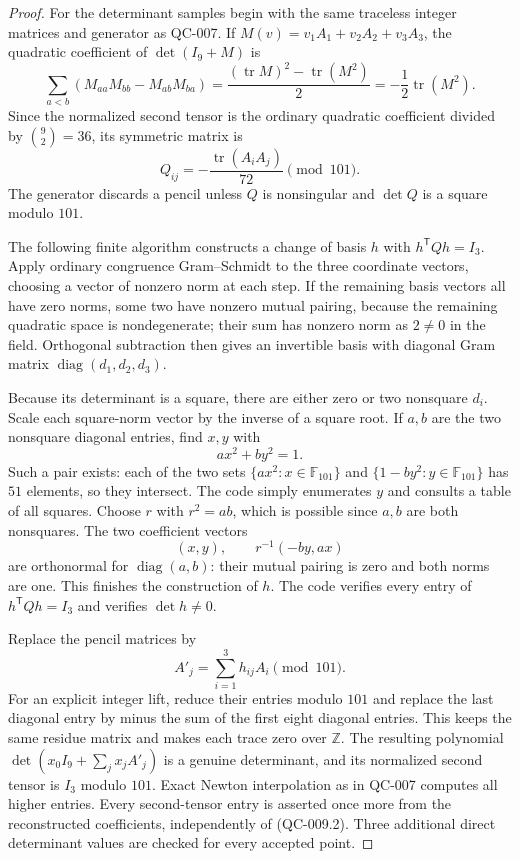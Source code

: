 \begin{proof}
For the determinant samples begin with the same traceless integer
matrices and generator as QC-007. If
$M(v)=v_1A_1+v_2A_2+v_3A_3$, the quadratic coefficient of
$\det(I_9+M)$ is
\[
 \sum_{a<b}(M_{aa}M_{bb}-M_{ab}M_{ba})
 =\frac{(\operatorname{tr}M)^2-\operatorname{tr}(M^2)}2
 =-\frac12\operatorname{tr}(M^2).
\]
Since the normalized second tensor is the ordinary quadratic
coefficient divided by $\binom92=36$, its symmetric matrix is
\[
 Q_{ij}=-\frac{\operatorname{tr}(A_iA_j)}{72}\pmod {101}.
 \tag{QC-009.2}
\]
The generator discards a pencil unless $Q$ is nonsingular and
$\det Q$ is a square modulo $101$.

The following finite algorithm constructs a change of basis $h$
with $h^{\mathsf T}Qh=I_3$. Apply ordinary congruence
Gram--Schmidt to the three coordinate vectors, choosing a vector
of nonzero norm at each step. If the remaining basis vectors
all have zero norms, some two have nonzero mutual pairing,
because the remaining quadratic space is nondegenerate; their
sum has nonzero norm as $2\ne0$ in the field. Orthogonal
subtraction then gives an invertible basis with diagonal Gram
matrix $\operatorname{diag}(d_1,d_2,d_3)$.

Because its determinant is a square, there are either zero or
two nonsquare $d_i$. Scale each square-norm vector by the
inverse of a square root. If $a,b$ are the two nonsquare
diagonal entries, find $x,y$ with
\[
 ax^2+by^2=1.
\]
Such a pair exists: each of the two sets
$\{ax^2:x\in\mathbb F_{101}\}$ and
$\{1-by^2:y\in\mathbb F_{101}\}$ has $51$ elements,
so they intersect. The code simply enumerates $y$ and consults
a table of all squares. Choose $r$ with $r^2=ab$, which is
possible since $a,b$ are both nonsquares. The two coefficient
vectors
\[
 (x,y),\qquad r^{-1}(-by,ax)
\]
are orthonormal for $\operatorname{diag}(a,b)$: their mutual
pairing is zero and both norms are one. This finishes the
construction of $h$. The code verifies every entry of
$h^{\mathsf T}Qh=I_3$ and verifies $\det h\ne0$.

Replace the pencil matrices by
\[
 A'_j=\sum_{i=1}^3h_{ij}A_i\pmod {101}.
 \tag{QC-009.3}
\]
For an explicit integer lift, reduce their entries modulo
$101$ and replace the last diagonal entry by minus the sum
of the first eight diagonal entries. This keeps the same
residue matrix and makes each trace zero over $\mathbb Z$.
The resulting polynomial
$\det(x_0I_9+\sum_jx_jA'_j)$ is a genuine determinant,
and its normalized second tensor is $I_3$ modulo $101$.
Exact Newton interpolation as in QC-007 computes all higher
entries. Every second-tensor entry is asserted once more
from the reconstructed coefficients, independently of
(QC-009.2). Three additional direct determinant values are
checked for every accepted point.


\end{proof}
